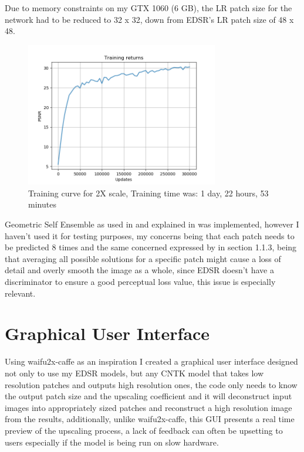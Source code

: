 \hfill

Due to memory constraints on my GTX 1060 (6 GB), the LR patch size for the network had to be reduced to 32 x 32, down from EDSR's LR patch size of 48 x 48.

\begin{figure}[H]
\centering
\includegraphics[width=0.75\textwidth]{../Figures/PSNR_Training_Curve}
\caption{Training curve for 2X scale, Training time was: 1 day, 22 hours, 53 minutes}
\end{figure}

\hfill

Geometric Self Ensemble as used in \cite{EDSR} and explained in \cite{IA} was implemented, however I haven't used it for testing purposes, my concerns being that each patch needs to be predicted 8 times and the same concerned expressed by \cite{SRGAN} in section 1.1.3, being that averaging all possible solutions for a specific patch might cause a loss of detail and overly smooth the image as a whole, since EDSR doesn't have a discriminator to ensure a good perceptual loss value, this issue is especially relevant.

\section{Graphical User Interface}

Using waifu2x-caffe as an inspiration I created a graphical user interface designed not only to use my EDSR models, but any CNTK model that takes low resolution patches and outputs high resolution ones, the code only needs to know the output patch size and the upscaling coefficient and it will deconstruct input images into appropriately sized patches and reconstruct a high resolution image from the results, additionally, unlike waifu2x-caffe, this GUI presents a real time preview of the upscaling process, a lack of feedback can often be upsetting to users especially if the model is being run on slow hardware.


